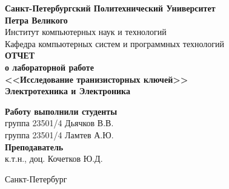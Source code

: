 \begin{titlepage}
\begin{center}
	\textbf{Санкт-Петербургский Политехнический Университет \\Петра Великого}\\[0.3cm]
	\small Институт компьютерных наук и технологий \\[0.3cm]
	\small Кафедра компьютерных систем и программных технологий\\[4cm]
	
	\textbf{ОТЧЕТ}\\ \textbf{о лабораторной работе}\\[0.5cm]
	\textbf{<<Исследование транизисторных ключей>>}\\[0.1cm]
	\textbf{Электротехника и Электроника}\\[10.5cm]
\end{center}

\begin{flushright}
	\begin{minipage}{0.60\textwidth}
		\begin{flushleft}
			\small \textbf{Работу выполнили студенты}\\[3mm]
			\small группа 23501/4 \hspace*{17mm} Дьячков В.В.\\[3mm]
			\small группа 23501/4 \hspace*{17mm} Ламтев А.Ю.\\[5mm]
			
			\small \textbf{Преподаватель}\\[5mm]
		 	\small \sign[3.5cm] \hspace*{8mm} к.т.н., доц. Кочетков Ю.Д.\\[0.5cm]
		\end{flushleft}
	\end{minipage}
\end{flushright}

\vfill

\begin{center}
	\small Санкт-Петербург\\
	\small \the\year
\end{center}
\end{titlepage}